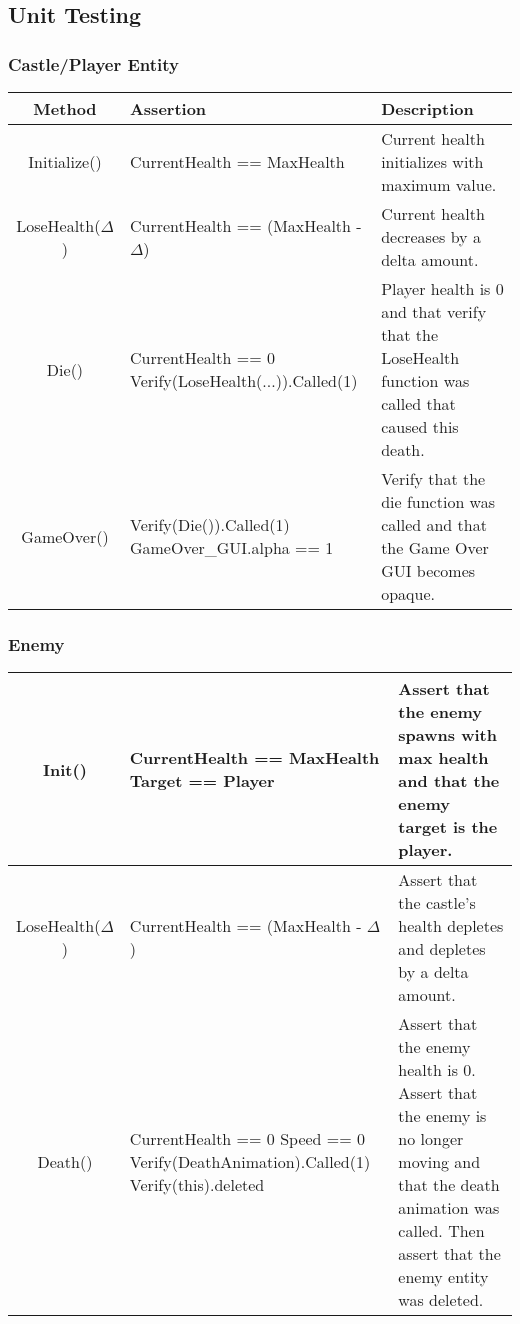 \subsection{Unit Testing}

\subsubsection{Castle/Player Entity}

\begin{table}[H]
	\centering
	\renewcommand*{\arraystretch}{1.5}
	\begin{tabular}{ | c | C{6.3cm} | L{4cm} | }
		\hline
		Method
			&	Assertion
			&	Description\\
		\hline
		Initialize()
			&	CurrentHealth == MaxHealth
			&	Current health initializes with maximum value.\\
		\hline
		LoseHealth($\Delta$)
			&	CurrentHealth == (MaxHealth - $\Delta$)
			&	Current health decreases by a delta amount.\\
		\hline
		Die()
			&	CurrentHealth == 0 \newline
				Verify(LoseHealth(...)).Called(1)
			&	Player health is 0 and that verify that the LoseHealth function was called that caused this death.\\
		\hline
		GameOver()
			&	Verify(Die()).Called(1) \newline
				GameOver\_GUI.alpha == 1
			&	Verify that the die function was called and that the Game Over GUI becomes opaque.\\
		\hline
	\end{tabular}
\end{table}

\subsubsection{Enemy}

\begin{table}[H]
	\renewcommand*{\arraystretch}{1.5}
	\centering
	\begin{tabular}{ | c | C{6.2cm} | L{4cm} |}
		\hline
		Init()
			&	CurrentHealth == MaxHealth \newline
				Target == Player
			&	Assert that the enemy spawns with max health and that the enemy target is the player.\\
		\hline
		LoseHealth($\Delta$)
			&	CurrentHealth == (MaxHealth - \( \Delta \))	
			&	Assert that the castle's health depletes and depletes by a delta amount.\\
		\hline
		Death()
			&	CurrentHealth == 0 \newline
				Speed == 0 \newline
				Verify(DeathAnimation).Called(1) \newline
				Verify(this).deleted \newline
			& Assert that the enemy health is 0. Assert that the enemy is no longer moving and that the death animation was called. Then assert that the enemy entity was deleted.\\
		\hline
	\end{tabular}
\end{table}

